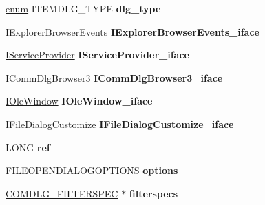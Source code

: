 \begin{DoxyCompactItemize}
\begin{tabbing}
\end{tabbing}\item 
\mbox{\label{struct_file_dialog_impl_a83069d60073d7de0b4626710ea1aef05}} 
\hyperlink{interfaceenum}{enum} I\+T\+E\+M\+D\+L\+G\+\_\+\+T\+Y\+PE {\bfseries dlg\+\_\+type}
\item 
\mbox{\label{struct_file_dialog_impl_aaedbb40ec439cd94276a8cab46683969}} 
I\+Explorer\+Browser\+Events {\bfseries I\+Explorer\+Browser\+Events\+\_\+iface}
\item 
\mbox{\label{struct_file_dialog_impl_a859bb4b94a06921f74192b6635375bfc}} 
\hyperlink{interface_i_service_provider}{I\+Service\+Provider} {\bfseries I\+Service\+Provider\+\_\+iface}
\item 
\mbox{\label{struct_file_dialog_impl_ab0d6c1b069e4b812d36d5483b45e2d9b}} 
\hyperlink{interface_i_comm_dlg_browser3}{I\+Comm\+Dlg\+Browser3} {\bfseries I\+Comm\+Dlg\+Browser3\+\_\+iface}
\item 
\mbox{\label{struct_file_dialog_impl_a57ec19e502510196aa482f64d5f07687}} 
\hyperlink{interface_i_ole_window}{I\+Ole\+Window} {\bfseries I\+Ole\+Window\+\_\+iface}
\item 
\mbox{\label{struct_file_dialog_impl_a18a008b020a2e3ab7dea7d05d2fc0d55}} 
I\+File\+Dialog\+Customize {\bfseries I\+File\+Dialog\+Customize\+\_\+iface}
\item 
\mbox{\label{struct_file_dialog_impl_a6a7e7387d82c5bfc0a6933bc0d863492}} 
L\+O\+NG {\bfseries ref}
\item 
\mbox{\label{struct_file_dialog_impl_a70f57e83e84187259ecaaec06b795b5b}} 
F\+I\+L\+E\+O\+P\+E\+N\+D\+I\+A\+L\+O\+G\+O\+P\+T\+I\+O\+NS {\bfseries options}
\item 
\mbox{\label{struct_file_dialog_impl_a583f5e202c8de9d871e06ff2ca13451e}} 
\hyperlink{struct___c_o_m_d_l_g___f_i_l_t_e_r_s_p_e_c}{C\+O\+M\+D\+L\+G\+\_\+\+F\+I\+L\+T\+E\+R\+S\+P\+EC} $\ast$ {\bfseries filterspecs}
\item 

\end{DoxyCompactItemize}
